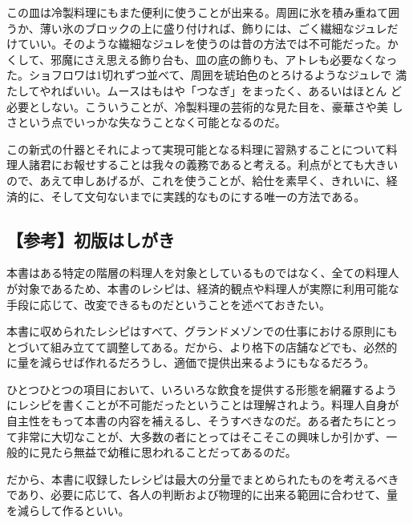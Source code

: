 この皿は冷製料理にもまた便利に使うことが出来る。周囲に氷を積み重ねて囲
うか、薄い氷のブロックの上に盛り付ければ、飾りには、ごく繊細なジュレだ
けていい。そのような繊細なジュレを使うのは昔の方法では不可能だった。か
くして、邪魔にさえ思える飾り台も、皿の底の飾りも、アトレも必要なくなっ
た。ショフロワは1切れずつ並べて、周囲を琥珀色のとろけるようなジュレで
満たしてやればいい。ムースはもはや「つなぎ」をまったく、あるいはほとん
ど必要としない。こういうことが、冷製料理の芸術的な見た目を、豪華さや美
しさという点でいっかな失なうことなく可能となるのだ。

この新式の什器とそれによって実現可能となる料理に習熟することについて料
理人諸君にお報せすることは我々の義務であると考える。利点がとても大きい
ので、あえて申しあげるが、これを使うことが、給仕を素早く、きれいに、経
済的に、そして文句ないまでに実践的なものにする唯一の方法である。

\hypertarget{ux53c2ux8003ux521dux7248ux306fux3057ux304cux304d}{%
\subsection{【参考】初版はしがき}\label{ux53c2ux8003ux521dux7248ux306fux3057ux304cux304d}}

本書はある特定の階層の料理人を対象としているものではなく、全ての料理人
が対象であるため、本書のレシピは、経済的観点や料理人が実際に利用可能な
手段に応じて、改変できるものだということを述べておきたい。

本書に収められたレシピはすべて、グランドメゾンでの仕事における原則にも
とづいて組み立てて調整してある。だから、より格下の店舗などでも、必然的
に量を減らせば作れるだろうし、適価で提供出来るようにもなるだろう。

ひとつひとつの項目において、いろいろな飲食を提供する形態を網羅するよう
にレシピを書くことが不可能だったということは理解されよう。料理人自身が
自主性をもって本書の内容を補えるし、そうすべきなのだ。ある者たちにとっ
て非常に大切なことが、大多数の者にとってはそこそこの興味しか引かず、一
般的に見たら無益で幼稚に思われることだってあるのだ。

だから、本書に収録したレシピは最大の分量でまとめられたものを考えるべき
であり、必要に応じて、各人の判断および物理的に出来る範囲に合わせて、量
を減らして作るといい。 \normalsize
